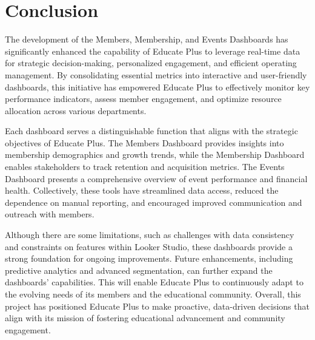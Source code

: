 \documentclass[11pt,a4paper,]{article}
\begin{document}
\section{Conclusion}\label{conclusion}

The development of the Members, Membership, and Events Dashboards has significantly enhanced the capability of Educate Plus to leverage real-time data for strategic decision-making, personalized engagement, and efficient operating management. By consolidating essential metrics into interactive and user-friendly dashboards, this initiative has empowered Educate Plus to effectively monitor key performance indicators, assess member engagement, and optimize resource allocation across various departments.

Each dashboard serves a distinguishable function that aligns with the strategic objectives of Educate Plus. The Members Dashboard provides insights into membership demographics and growth trends, while the Membership Dashboard enables stakeholders to track retention and acquisition metrics. The Events Dashboard presents a comprehensive overview of event performance and financial health. Collectively, these tools have streamlined data access, reduced the dependence on manual reporting, and encouraged improved communication and outreach with members.

Although there are some limitations, such as challenges with data consistency and constraints on features within Looker Studio, these dashboards provide a strong foundation for ongoing improvements. Future enhancements, including predictive analytics and advanced segmentation, can further expand the dashboards' capabilities. This will enable Educate Plus to continuously adapt to the evolving needs of its members and the educational community. Overall, this project has positioned Educate Plus to make proactive, data-driven decisions that align with its mission of fostering educational advancement and community engagement.

\printbibliography
\end{document}
